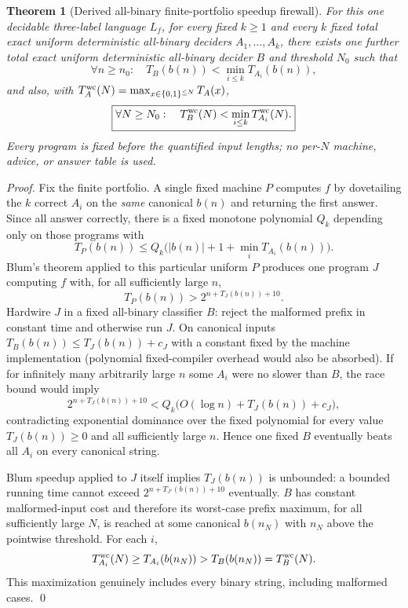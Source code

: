 \documentclass[11pt]{article}
\newtheorem{theorem}{Theorem}
\begin{document}
\begin{theorem}[Derived all-binary finite-portfolio speedup firewall]
For this one decidable three-label language $L_f$, for every fixed $k\ge1$ and every $k$ fixed total exact uniform deterministic all-binary deciders $A_1,\ldots,A_k$, there exists one further total exact uniform deterministic all-binary decider $B$ and threshold $N_0$ such that
\[
\forall n\ge n_0:\quad T_B(b(n))<\min_{i\le k}T_{A_i}(b(n)),
\]
and also, with $T_A^{\rm wc}(N)=\max_{x\in\{0,1\}^{\le N}}T_A(x)$,
\[
\boxed{\forall N\ge N_0:\quad T_B^{\rm wc}(N)<\min_{i\le k}T_{A_i}^{\rm wc}(N).}
\]
Every program is fixed before the quantified input lengths; no per-$N$ machine, advice, or answer table is used.
\end{theorem}
\begin{proof}
Fix the finite portfolio. A single fixed machine $P$ computes $f$ by dovetailing the $k$ correct $A_i$ on the \emph{same} canonical $b(n)$ and returning the first answer. Since all answer correctly, there is a fixed monotone polynomial $Q_k$ depending only on those programs with
\[
T_P(b(n))\le Q_k\bigl(|b(n)|+1+\min_iT_{A_i}(b(n))\bigr).
\]
Blum's theorem applied to this particular uniform $P$ produces one program $J$ computing $f$ with, for all sufficiently large $n$,
\[
T_P(b(n))>2^{n+T_J(b(n))+10}.
\]
Hardwire $J$ in a fixed all-binary classifier $B$: reject the malformed prefix in constant time and otherwise run $J$. On canonical inputs $T_B(b(n))\le T_J(b(n))+c_J$ with a constant fixed by the machine implementation (polynomial fixed-compiler overhead would also be absorbed). If for infinitely many arbitrarily large $n$ some $A_i$ were no slower than $B$, the race bound would imply
\[
2^{n+T_J(b(n))+10}
<Q_k\bigl(O(\log n)+T_J(b(n))+c_J\bigr),
\]
contradicting exponential dominance over the fixed polynomial for every value $T_J(b(n))\ge0$ and all sufficiently large $n$. Hence one fixed $B$ eventually beats all $A_i$ on every canonical string.

Blum speedup applied to $J$ itself implies $T_J(b(n))$ is unbounded: a bounded running time cannot exceed $2^{n+T_{J'}(b(n))+10}$ eventually. $B$ has constant malformed-input cost and therefore its worst-case prefix maximum, for all sufficiently large $N$, is reached at some canonical $b(n_N)$ with $n_N$ above the pointwise threshold. For each $i$,
\[
T_{A_i}^{\rm wc}(N)\ge T_{A_i}(b(n_N))>T_B(b(n_N))=T_B^{\rm wc}(N).
\]
This maximization genuinely includes every binary string, including malformed cases. \qed
\end{proof}
\end{document}
